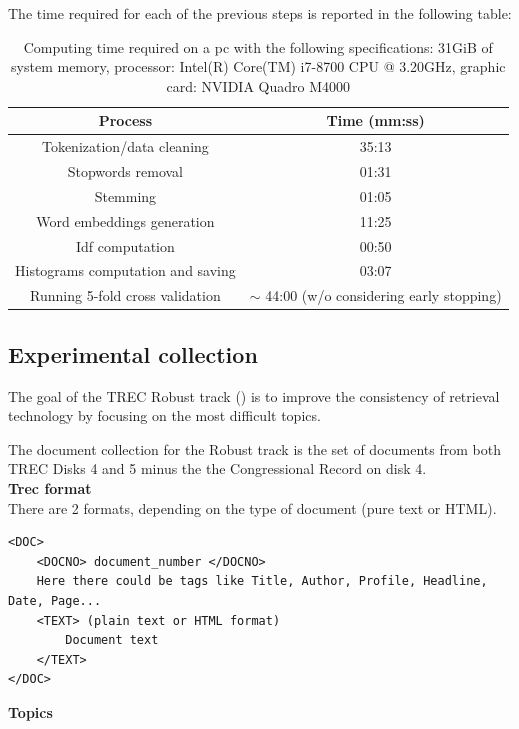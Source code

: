 The time required for each of the previous steps is reported in the following table:

\begin{table}[h!]
\centering
 \begin{tabular}{cc} 
 \hline
 Process & Time (mm:ss) \\
 \hline
 Tokenization/data cleaning & 35:13 \\
 Stopwords removal & 01:31 \\
 Stemming & 01:05 \\
 Word embeddings generation & 11:25 \\
 Idf computation & 00:50 \\
 Histograms computation and saving & 03:07 \\
 Running 5-fold cross validation & $\sim$ 44:00 (w/o considering early stopping) \\
 \hline
 \end{tabular}
 \caption{Computing time required on a pc with the following specifications: 31GiB of system memory, processor: Intel(R) Core(TM) i7-8700 CPU @ 3.20GHz, graphic card: NVIDIA Quadro M4000}
 \label{table:timeit}
\end{table}

\subsection{Experimental collection}

The goal of the TREC Robust track (\cite{rob04}) is to improve the consistency of retrieval
technology by focusing on the most difficult topics.

The document collection for the Robust track is the set of documents from both TREC Disks 4 and 5 minus the the Congressional Record on disk 4.\\

\textbf{Trec format}\\

There are 2 formats, depending on the type of document (pure text or HTML).\\

\begin{lstlisting}
<DOC>
	<DOCNO> document_number </DOCNO>
	Here there could be tags like Title, Author, Profile, Headline, Date, Page...
	<TEXT> (plain text or HTML format)
		Document text
	</TEXT>
</DOC>
\end{lstlisting}

\textbf{Topics}\\

